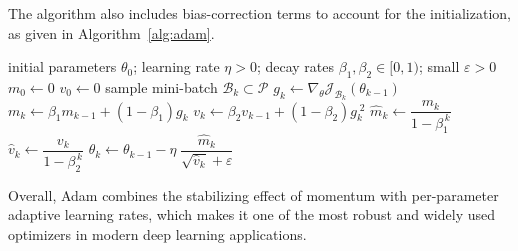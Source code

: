 The algorithm also includes bias-correction terms to account for the
initialization, as given in Algorithm~\ref{alg:adam}.

\begin{algorithm}[H]
\caption{Adam Optimizer}
\label{alg:adam}
\begin{algorithmic}[1]
\Require initial parameters $\theta_0$; learning rate $\eta>0$; decay rates
$\beta_1,\beta_2\in[0,1)$; small $\varepsilon>0$ \State $m_0 \gets 0$ \State
$v_0 \gets 0$  \State sample mini-batch $\mathcal{B}_k
\subset \mathcal{P}$ \State $g_k \gets \nabla_\theta
\mathcal{J}_{\mathcal{B}_k}(\theta_{k-1})$ \State $m_k \gets \beta_1 m_{k-1} +
(1-\beta_1) g_k$  \State $v_k \gets \beta_2 v_{k-1} +
(1-\beta_2) g_k^{\;2}$  \State $\hat m_k \gets
\dfrac{m_k}{1-\beta_1^{\,k}}$  \State $\hat v_k \gets
\dfrac{v_k}{1-\beta_2^{\,k}}$  \State $\theta_k \gets
\theta_{k-1} - \eta \; \dfrac{\hat m_k}{\sqrt{\hat v_k}+\varepsilon}$ \EndFor
\end{algorithmic}
\end{algorithm}

Overall, Adam combines the stabilizing effect of momentum with per-parameter
adaptive learning rates, which makes it one of the most robust and widely used
optimizers in modern deep learning applications.
